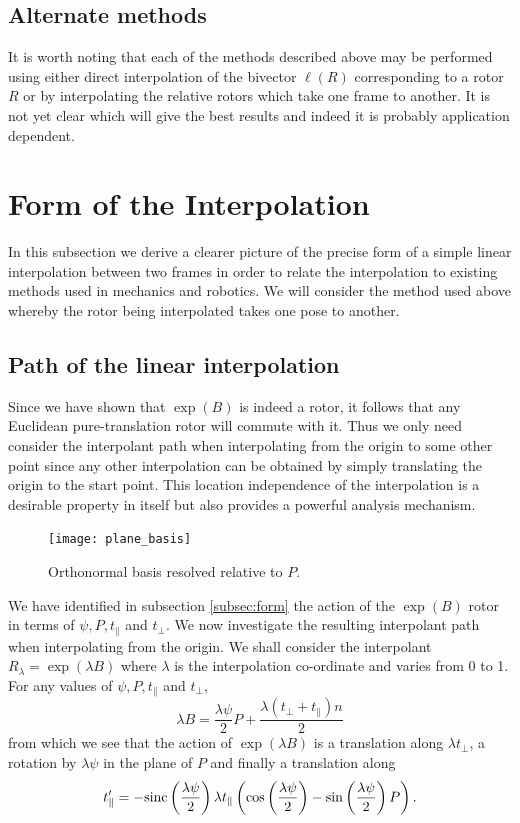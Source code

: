 \subsection{Alternate methods}

It is worth noting that each of the methods described above may be performed
using either direct interpolation of the bivector $\ell(R)$ corresponding
to a rotor $R$ or by interpolating the relative rotors which take one frame
to another. It is not yet clear which will give the best results and indeed
it is probably application dependent.


\section{Form of the Interpolation}

In this subsection we derive a clearer picture of the precise form of
a simple linear interpolation between two frames in order to relate the 
interpolation to existing methods used in mechanics and robotics. We will consider
the method used above whereby the rotor being interpolated takes one pose to another.

\subsection{Path of the linear interpolation}

Since we have shown that $\exp(B)$ is indeed a rotor, it follows that any
Euclidean pure-translation rotor will commute with it. Thus we only need consider the
interpolant path when interpolating from the origin to some other point since
any other interpolation can be obtained by simply translating the origin to
the start point. This location independence of the interpolation is a 
desirable property in itself but also provides a powerful analysis mechanism.

\begin{figure}\centering
\texttt{[image: plane\_basis]}
\caption{\label{fig:plane_basis}Orthonormal basis resolved relative to $P$.}
\end{figure}

We have identified in subsection \ref{subsec:form} the action of the $\exp(B)$
rotor in terms of $\psi, P, t_\parallel$ and $t_\perp$. We now investigate the resulting interpolant
path when interpolating from the origin. We shall consider the interpolant
$R_\lambda = \exp(\lambda B)$ where $\lambda$ is the interpolation co-ordinate and
varies from 0 to 1. For any values of $\psi, P, t_\parallel$ and $t_\perp$,
\[
\lambda B = \frac{\lambda \psi}{2} P + \frac{\lambda (t_\perp + t_\parallel) n}{2}
\]
from which we see that the action of $\exp(\lambda B)$ is a translation along $\lambda t_\perp$, a rotation by
$\lambda \psi$ in the plane of $P$ and finally a translation along
\[
t'_\parallel =- \mathrm{sinc}\left(\frac{\lambda\psi}{2}\right)
\lambda t_\parallel
\left(
\cos\left(\frac{\lambda \psi}{2}\right) -
\sin\left(\frac{\lambda \psi}{2}\right) P 
\right).
\]

